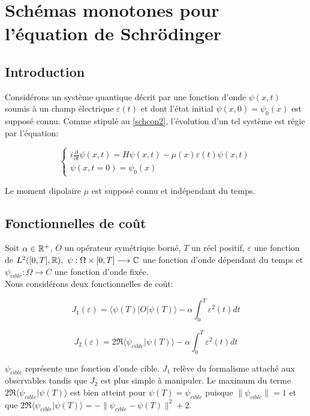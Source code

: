 \chapter{Schémas monotones pour l'équation de Schrödinger}

\section{Introduction}

Considérons un système quantique décrit par une fonction d’onde $\psi(x, t)$ soumis à un champ électrique $\varepsilon(t)$ et dont l’état initial $\psi(x, 0) = \psi_0 (x)$ est supposé connu. Comme stipulé au \eqref{schcon2}, l’évolution d’un tel système est régie par l’équation:

\begin{equation}
\begin{cases}
i \frac{\partial}{\partial t} \psi (x,t) = H\psi(x,t) - \mu(x)\varepsilon(t)\psi(x,t)\\
\psi(x,t=0)=\psi_0(x)
\end{cases}
\end{equation}

Le moment dipolaire $\mu$ est supposé connu et indépendant du temps.

\section{Fonctionnelles de coût}
Soit $\alpha \in \mathbb R^+$, $O$ un opérateur symétrique borné, $T$ un réel positif, $\varepsilon$ une fonction de $L^2 ([0, T ], \mathbb R),\  \psi : \Omega \times [0, T ] \longrightarrow \mathbb C$ une fonction d’onde dépendant du temps et $\psi_{cible} : \Omega \longrightarrow C$ une fonction d’onde fixée.
\\Nous considérons deux fonctionnelles de coût:

\begin{equation}
J_1(\varepsilon) = \langle \psi(T)|O|\psi(T) \rangle - \alpha \int_0^T \varepsilon^2(t)dt
\end{equation}

\begin{equation}
J_2(\varepsilon) = 2\Re\langle \psi_{cible}|\psi(T)\rangle - \alpha \int_0^T \varepsilon^2(t)dt
\end{equation}

$\psi_{cible}$ représente une fonction d’onde cible. $J_1$ relève du formalisme attaché aux observables tandis que $J_2$ est plus simple à manipuler.
Le maximum du terme $2\Re\langle \psi_{cible}|\psi(T)\rangle$ est bien atteint pour $\psi(T) = \psi_{cible}$ puisque $\lVert \psi_{cible} \rVert = 1$ et que $2\Re\langle \psi_{cible}|\psi(T)\rangle = -\lVert \psi_{cible} - \psi(T)\rVert ^2+2$.\\

